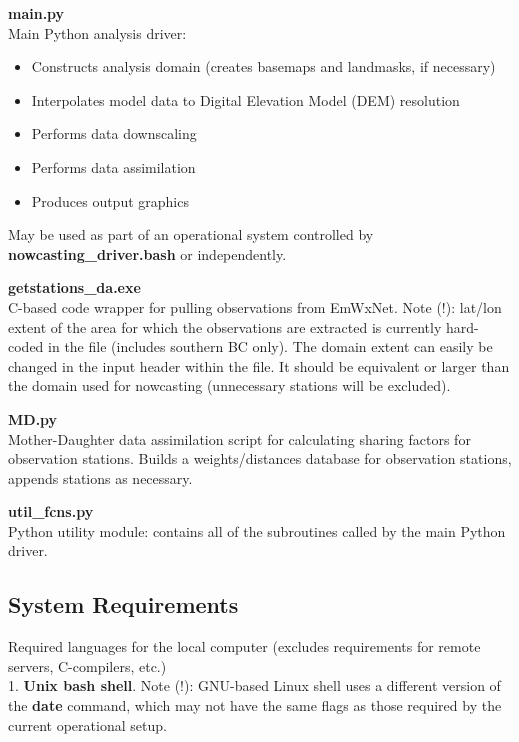 \documentclass{article}
\begin{document}
\vspace{0.3cm}
\noindent \textbf{main.py}\\
Main Python analysis driver: 
\begin{itemize}[noitemsep]\vspace{-2mm}
	\item Constructs analysis domain (creates basemaps and landmasks, if necessary) 
	\item Interpolates model data to Digital Elevation Model (DEM) resolution
	\item Performs data downscaling
	\item Performs data assimilation
	\item Produces output graphics
\end{itemize}
May be used as part of an operational system controlled by \textbf{nowcasting\_driver.bash} or independently. 

\vspace{0.3cm}
\noindent \textbf{getstations\_da.exe}\\
C-based code wrapper for pulling observations from EmWxNet. Note (!): lat/lon extent of the area for which the observations are extracted is currently hard-coded in the file (includes southern BC only). The domain extent can easily be changed in the input header within the file. It should be equivalent or larger than the domain used for nowcasting (unnecessary stations will be excluded).

\vspace{0.3cm}
\noindent \textbf{MD.py}\\
Mother-Daughter data assimilation script for calculating sharing factors for observation stations. Builds a weights/distances database for observation stations, appends stations as necessary.

\vspace{0.3cm}
\noindent \textbf{util\_fcns.py}\\
Python utility module: contains all of the subroutines called by the main Python driver. 


\subsection{System Requirements}
Required languages for the local computer (excludes requirements for remote servers, C-compilers, etc.)\\

1. \textbf{Unix bash shell}. Note (!): GNU-based Linux shell uses a different version of the \textbf{date} command, which may not have the same flags as those required by the current operational setup. \\
\end{document}

